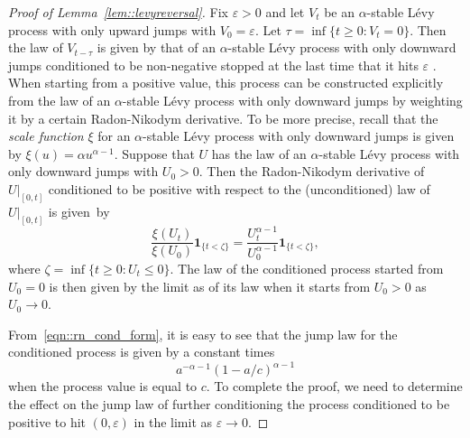 \documentclass[10pt]{amsart}
\let\epsilon\varepsilon
\theoremstyle{plain}
\numberwithin{theorem}{section}
\theoremstyle{definition}
\newcommand{\one}{{\mathbf 1}}
\begin{document}
\begin{proof}[Proof of Lemma~\ref{lem::levyreversal}]
Fix $\epsilon > 0$ and let $V_t$ be an $\alpha$-stable Lévy process with only upward jumps with $V_0 = \epsilon$. Let $\tau = \inf\{t \geq 0 : V_t = 0\}$. Then the law of $V_{t-\tau}$ is given by that of an $\alpha$-stable Lévy process with only downward jumps conditioned to be non-negative stopped at the last time that it hits $\epsilon$ \cite[Chap.\,VII, Th.\,18]{bertoinlevybook}. When starting from a positive value, this process can be constructed explicitly from the law of an $\alpha$-stable Lévy process with only downward jumps by weighting it by a certain Radon-Nikodym derivative. To be more precise, recall that the \emph{scale function} \cite[Chap.\,VII.2]{bertoinlevybook} $\xi$ for an $\alpha$-stable Lévy process with only downward jumps is given by $\xi(u) = \alpha u^{\alpha-1}$. Suppose that $U$ has the law of an $\alpha$-stable Lévy process with only downward jumps with $U_0 > 0$. Then the Radon-Nikodym derivative of $U|_{[0,t]}$ conditioned to be positive with respect to the (unconditioned) law of $U|_{[0,t]}$ is given~by%
\begin{equation}
\label{eqn::rn_cond_form}
	\frac{\xi(U_t)}{\xi(U_0)} \one_{\{t < \zeta\}} = \frac{U_t^{\alpha-1}}{U_0^{\alpha-1}} \one_{\{t < \zeta\}},
\end{equation}
where $\zeta = \inf\{t \geq 0 : U_t \leq 0\}$. The law of the conditioned process started from $U_0 = 0$ is then given by the limit as of its law when it starts from $U_0 > 0$ as $U_0 \to 0$.

From~\eqref{eqn::rn_cond_form}, it is easy to see that the jump law for the conditioned process is given by a constant times
\begin{equation}
\label{eqn::cond_pos_jump_law}
a^{-\alpha-1}(1-a/c)^{\alpha-1}	
\end{equation}
when the process value is equal to $c$. To complete the proof, we need to determine the effect on the jump law of further conditioning the process conditioned to be positive to hit $(0,\epsilon)$ in the limit as $\epsilon \to 0$.


\end{proof}
\end{document}
